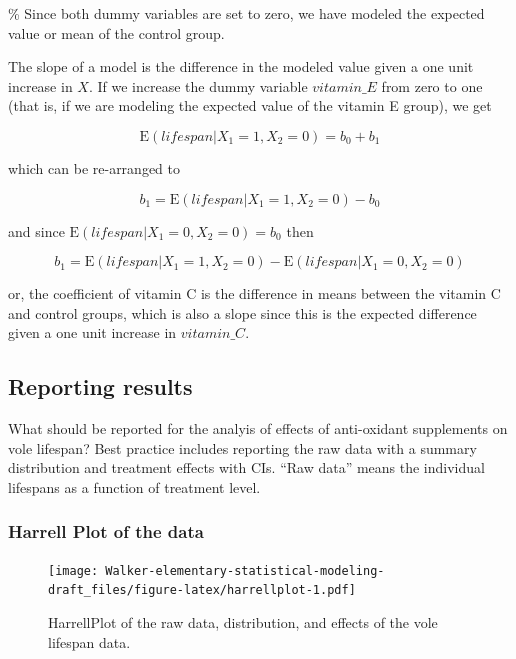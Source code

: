 \documentclass[]{book}
\begin{document}
\% Since both dummy variables are set to zero, we have modeled the
expected value or mean of the control group.

The slope of a model is the difference in the modeled value given a one
unit increase in \(X\). If we increase the dummy variable \(vitamin\_E\)
from zero to one (that is, if we are modeling the expected value of the
vitamin E group), we get

\begin{equation}
\mathrm{E}(lifespan|X_1=1, X_2=0) = b_0 + b_1
\end{equation}

which can be re-arranged to

\begin{equation}
b_1 = \mathrm{E}(lifespan|X_1=1, X_2=0) - b_0
\end{equation}

and since \(\mathrm{E}(lifespan|X_1=0, X_2=0) = b_0\) then

\begin{equation}
b_1 = \mathrm{E}(lifespan|X_1=1, X_2=0) - \mathrm{E}(lifespan|X_1=0, X_2=0)
\end{equation}

or, the coefficient of vitamin C is the difference in means between the
vitamin C and control groups, which is also a slope since this is the
expected difference given a one unit increase in \(vitamin\_C\).

\subsection{Reporting results}\label{reporting-results-1}

What should be reported for the analyis of effects of anti-oxidant
supplements on vole lifespan? Best practice includes reporting the raw
data with a summary distribution and treatment effects with CIs. ``Raw
data'' means the individual lifespans as a function of treatment level.

\subsubsection{Harrell Plot of the data}\label{harrell-plot-of-the-data}

\begin{figure}
\centering
\texttt{[image: Walker-elementary-statistical-modeling-draft\_files/figure-latex/harrellplot-1.pdf]}
\caption{\label{fig:harrellplot}HarrellPlot of the raw data, distribution,
and effects of the vole lifespan data.}
\end{figure}
\end{document}
